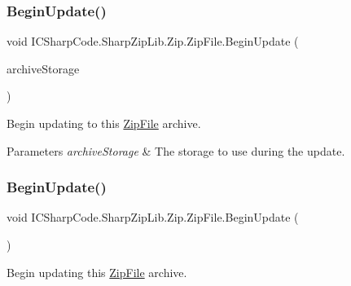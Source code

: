 \subsubsection{\texorpdfstring{Begin\+Update()}{BeginUpdate()}\hspace{0.1cm}{\footnotesize\ttfamily [2/3]}}
{\footnotesize\ttfamily void I\+C\+Sharp\+Code.\+Sharp\+Zip\+Lib.\+Zip.\+Zip\+File.\+Begin\+Update (\begin{DoxyParamCaption}\item[{\hyperlink{interface_i_c_sharp_code_1_1_sharp_zip_lib_1_1_zip_1_1_i_archive_storage}{I\+Archive\+Storage}}]{archive\+Storage }\end{DoxyParamCaption})\hspace{0.3cm}{\ttfamily [inline]}}



Begin updating to this \hyperlink{class_i_c_sharp_code_1_1_sharp_zip_lib_1_1_zip_1_1_zip_file}{Zip\+File} archive. 


\begin{DoxyParams}{Parameters}
{\em archive\+Storage} & The storage to use during the update.\\
\hline
\end{DoxyParams}
\mbox{\label{class_i_c_sharp_code_1_1_sharp_zip_lib_1_1_zip_1_1_zip_file_a938dbbc553b0dc77b2c4914cec1da8a5}} 
\subsubsection{\texorpdfstring{Begin\+Update()}{BeginUpdate()}\hspace{0.1cm}{\footnotesize\ttfamily [3/3]}}
{\footnotesize\ttfamily void I\+C\+Sharp\+Code.\+Sharp\+Zip\+Lib.\+Zip.\+Zip\+File.\+Begin\+Update (\begin{DoxyParamCaption}{ }\end{DoxyParamCaption})\hspace{0.3cm}{\ttfamily [inline]}}



Begin updating this \hyperlink{class_i_c_sharp_code_1_1_sharp_zip_lib_1_1_zip_1_1_zip_file}{Zip\+File} archive. 

